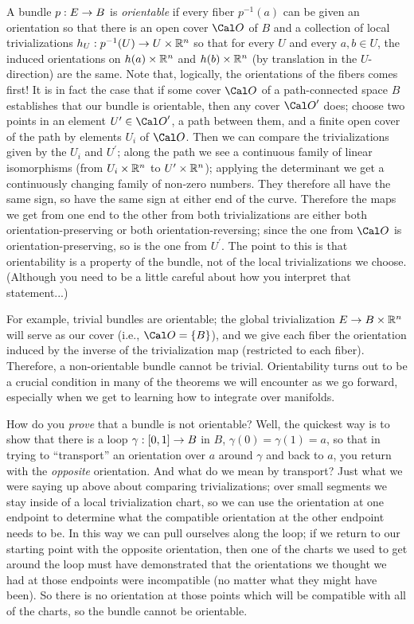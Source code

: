 \ssk

A bundle $p:E\rightarrow B$ is {\it orientable} if every fiber $p^{-1}(a)$ can be given 
an orientation so that there is an open cover $\Cal O$ of $B$ and
a collection of local trivializations $h_U:p^{-1}(U)\rightarrow U\times {\Bbb R}^n$ so that 
for every $U$ and every $a,b\in U$, the induced orientations on $h(a)\times {\Bbb R}^n$
and $h(b)\times {\Bbb R}^n$ (by translation in the $U$-direction) are the same. 
Note that, logically, the orientations of the fibers
comes first! It is in fact the case that if some cover ${\Cal O}$ of a path-connected space $B$ 
establishes that our bundle is orientable, then any cover ${\Cal O}^\prime$ does; choose two points in
an element $U^\prime\in {\Cal O}^\prime$, a path between them, and a finite open cover of the 
path by elements $U_i$ of ${\Cal O}$. Then we can compare the trivializations given by the $U_i$
and $U^\prime$; along the path we see a continuous family of linear isomorphisms (from $U_i\times {\Bbb R}^n$
to $U^\prime\times{\Bbb R}^n$); applying the determinant we get a continuously changing family of
non-zero numbers. They therefore all have the same sign, so have the same sign at either end of
the curve. Therefore the maps we get from one end to the other from both trivializations
are either both orientation-preserving or both orientation-reversing; since the one from ${\Cal O}$
is orientation-preserving, so is the one from $U^\prime$. The point to this is that orientability
is a property of the bundle, not of the local trivializations we choose. (Although you need 
to be a little careful about how you interpret that statement...)

\ssk

For example, trivial bundles are orientable; the global trivialization $E\rightarrow B\times {\Bbb R}^n$
will serve as our cover (i.e., ${\Cal O} = \{B\}$), and we give each fiber the
orientation induced by the inverse of the trivialization map (restricted to each fiber). Therefore, 
a non-orientable bundle cannot be trivial. Orientability turns out to be a crucial condition
in many of the theorems we will encounter as we go forward, especially when we get to learning
how to integrate over manifolds. 

How do you {\it prove} that a bundle is not orientable? Well, the quickest way is to
show that there is a loop $\gamma:[0,1]\rightarrow B$ in $B$, $\gamma(0)=\gamma(1)=a$, so
that in trying to ``transport'' an orientation over $a$ around $\gamma$ and back to $a$, 
you return with the {\it opposite} orientation. And what do we mean by transport?
Just what we were saying up above about comparing trivializations; over small segments
we stay inside of a local trivialization chart, so we can use the orientation at
one endpoint to determine what the compatible orientation at the other endpoint
needs to be. In this way we can pull ourselves along the loop; if we
return to our starting point with the opposite orientation, then one of the charts
we used to get around the loop must have demonstrated that the orientations we
thought we had at those endpoints were incompatible (no matter what they might have been).
So there is no orientation at those points which will be compatible with all of
the charts, so the bundle cannot be orientable.

